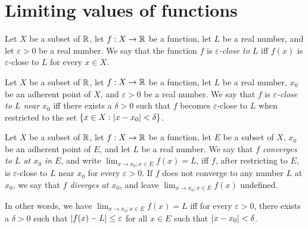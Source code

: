 \section{Limiting values of functions}\label{sec:9.3}

\begin{defn}\label{9.3.1}
  Let \(X\) be a subset of \(\mathbb{R}\), let \(f : X \to \mathbb{R}\) be a function, let \(L\) be a real number, and let \(\varepsilon > 0\) be a real number.
  We say that the function \(f\) is \emph{\(\varepsilon\)-close to \(L\)} iff \(f(x)\) is \(\varepsilon\)-close to \(L\) for every \(x \in X\).
\end{defn}

\setcounter{thm}{2}
\begin{defn}\label{9.3.3}
  Let \(X\) be a subset of \(\mathbb{R}\), let \(f : X \to \mathbb{R}\) be a function, let \(L\) be a real number, \(x_0\) be an adherent point of \(X\), and \(\varepsilon > 0\) be a real number.
  We say that \(f\) is \emph{\(\varepsilon\)-close to \(L\) near \(x_0\)} iff there exists a \(\delta > 0\) such that \(f\) becomes \(\varepsilon\)-close to \(L\) when restricted to the set \(\{x \in X : \left\lvert x - x_0\right\rvert < \delta\}\).
\end{defn}

\setcounter{thm}{5}
\begin{defn}\label{9.3.6}
  Let \(X\) be a subset of \(\mathbb{R}\), let \(f : X \to \mathbb{R}\) be a function, let \(E\) be a subset of \(X\), \(x_0\) be an adherent point of \(E\), and let \(L\) be a real number.
  We say that \emph{\(f\) converges to \(L\) at \(x_0\) in \(E\)}, and write \(\lim_{x \to x_0 ; x \in E} f(x) = L\), iff \(f\), after restricting to \(E\), is \(\varepsilon\)-close to \(L\) near \(x_0\) for every \(\varepsilon > 0\).
  If \(f\) does not converge to any number \(L\) at \(x_0\), we say that \emph{\(f\) diverges at \(x_0\)}, and leave \(\lim_{x \to x_0 ; x \in E} f(x)\) undefined.
\end{defn}

\begin{note}
  In other words, we have \(\lim_{x \to x_0 ; x \in E} f(x) = L\) iff for every \(\varepsilon > 0\), there exists a \(\delta > 0\) such that \(\left\lvert f(x) - L\right\rvert \leq \varepsilon\) for all \(x \in E\) such that \(\left\lvert x - x_0\right\rvert < \delta\).
\end{note}

